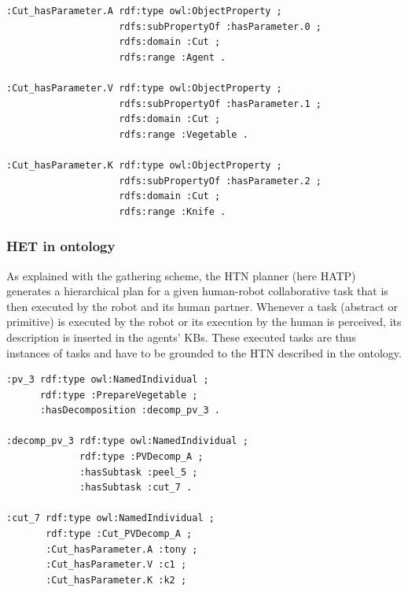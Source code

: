 \begin{lstlisting}[frame=single, basicstyle=\scriptsize\ttfamily, label={lst:chap6_owl_params}, caption={Description of the \textit{hasParameter} property specifications for the parameters (resp. the agent performing the task, the cut vegetable, and the used knife) of the \textit{Cut} primitive task in the OWL language using the Turle syntax.},captionpos=b, style=OwlTurtle]
:Cut_hasParameter.A rdf:type owl:ObjectProperty ;
                    rdfs:subPropertyOf :hasParameter.0 ;
                    rdfs:domain :Cut ;
                    rdfs:range :Agent .

:Cut_hasParameter.V rdf:type owl:ObjectProperty ;
                    rdfs:subPropertyOf :hasParameter.1 ;
                    rdfs:domain :Cut ;
                    rdfs:range :Vegetable .

:Cut_hasParameter.K rdf:type owl:ObjectProperty ;
                    rdfs:subPropertyOf :hasParameter.2 ;
                    rdfs:domain :Cut ;
                    rdfs:range :Knife .
\end{lstlisting}

\subsubsection{HET in ontology}

As explained with the gathering scheme, the HTN planner (here HATP) generates a hierarchical plan for a given human-robot collaborative task that is then executed by the robot and its human partner. Whenever a task (abstract or primitive) is executed by the robot or its execution by the human is perceived, its description is inserted in the agents' KBs. These executed tasks are thus instances of tasks and have to be grounded to the HTN described in the ontology.

\begin{lstlisting}[frame=single, basicstyle=\scriptsize\ttfamily, label={lst:chap6_owl_plan}, caption={A partial description of the initiation of a decomposition of a PrepareVegetable task and its primitive Cut task resulting from a plan and linked to the description of the domain. Description is provided in the OWL language using the Turle syntax.},captionpos=b, style=OwlTurtle_indiv]
:pv_3 rdf:type owl:NamedIndividual ;
      rdf:type :PrepareVegetable ;
      :hasDecomposition :decomp_pv_3 .

:decomp_pv_3 rdf:type owl:NamedIndividual ;
             rdf:type :PVDecomp_A ;
             :hasSubtask :peel_5 ;
             :hasSubtask :cut_7 .

:cut_7 rdf:type owl:NamedIndividual ;
       rdf:type :Cut_PVDecomp_A ;
       :Cut_hasParameter.A :tony ;
       :Cut_hasParameter.V :c1 ;
       :Cut_hasParameter.K :k2 ;
\end{lstlisting}

